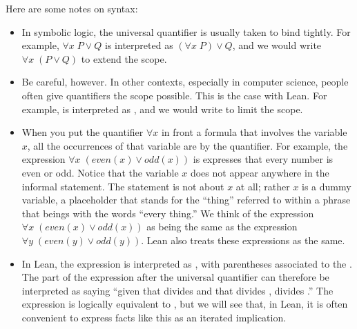 \documentclass[letterpaper,10pt,english]{sphinxmanual}
\begin{document}
\sphinxAtStartPar
Here are some notes on syntax:
\begin{itemize}
\item {} 
\sphinxAtStartPar
In symbolic logic, the universal quantifier is usually taken to bind tightly. For example, \(\forall x \; P \vee Q\) is interpreted as \((\forall x \; P) \vee Q\), and we would write \(\forall x \; (P \vee Q)\) to extend the scope.

\item {} 
\sphinxAtStartPar
Be careful, however. In other contexts, especially in computer science, people often give quantifiers the  scope possible. This is the case with Lean. For example,  is interpreted as , and we would write  to limit the scope.

\item {} 
\sphinxAtStartPar
When you put the quantifier \(\forall x\) in front a formula that involves the variable \(x\), all the occurrences of that variable are  by the quantifier. For example, the expression \(\forall x \; (\mathit{even}(x) \vee \mathit{odd}(x))\) is expresses that every number is even or odd. Notice that the variable \(x\) does not appear anywhere in the informal statement. The statement is not about \(x\) at all; rather \(x\) is a dummy variable, a placeholder that stands for the “thing” referred to within a phrase that beings with the words “every thing.” We think of the expression \(\forall x \; (\mathit{even}(x) \vee \mathit{odd}(x))\) as being the same as the expression \(\forall y \; (\mathit{even}(y) \vee \mathit{odd}(y))\). Lean also treats these expressions as the same.

\item {} 
\sphinxAtStartPar
In Lean, the expression  is interpreted as , with parentheses associated to the . The part of the expression after the universal quantifier can therefore be interpreted as saying “given that  divides  and that  divides ,  divides .” The expression is logically equivalent to , but we will see that, in Lean, it is often convenient to express facts like this as an iterated implication.

\end{itemize}
\end{document}
